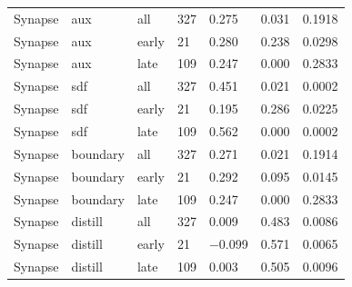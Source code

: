 \begin{tabular}{lllllll}
Synapse & aux & all & 327 & 0.275 & 0.031 & 0.1918 \\
Synapse & aux & early & 21 & 0.280 & 0.238 & 0.0298 \\
Synapse & aux & late & 109 & 0.247 & 0.000 & 0.2833 \\
Synapse & sdf & all & 327 & 0.451 & 0.021 & 0.0002 \\
Synapse & sdf & early & 21 & 0.195 & 0.286 & 0.0225 \\
Synapse & sdf & late & 109 & 0.562 & 0.000 & 0.0002 \\
Synapse & boundary & all & 327 & 0.271 & 0.021 & 0.1914 \\
Synapse & boundary & early & 21 & 0.292 & 0.095 & 0.0145 \\
Synapse & boundary & late & 109 & 0.247 & 0.000 & 0.2833 \\
Synapse & distill & all & 327 & 0.009 & 0.483 & 0.0086 \\
Synapse & distill & early & 21 & $-$0.099 & 0.571 & 0.0065 \\
Synapse & distill & late & 109 & 0.003 & 0.505 & 0.0096 \\
\bottomrule
\end{tabular}
